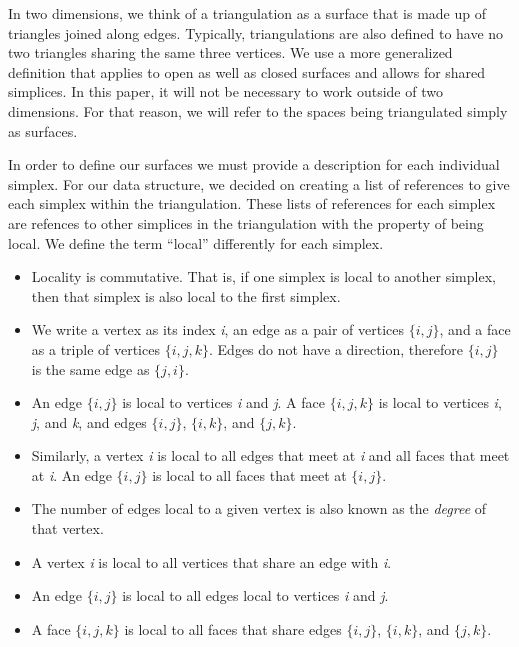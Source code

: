 \documentclass[12pt]{article}
\begin{document}
 In two dimensions, we think of a triangulation as a surface that is made up of triangles joined along edges. Typically, triangulations are also defined to have no two triangles sharing the same three vertices. We use a more generalized definition that applies to open as well as closed surfaces and allows for shared simplices. In this paper, it will not be necessary to work outside of two dimensions. For that reason, we will refer to the spaces being triangulated simply as surfaces.

 In order to define our surfaces we must provide a description for each individual simplex. For our data structure, we decided on creating a list of references to give each simplex within the triangulation. These lists of references for each simplex are refences to other simplices in the triangulation with the property of being local. We define the term ``local'' differently for each simplex.

\begin{itemize}
\item Locality is commutative. That is, if one simplex is local to another simplex, then that simplex is also local to the first simplex.
\item We write a vertex as its index \textit{i}, an edge as a pair of vertices $\{i, j\}$, and a face as a triple of vertices $\{i, j, k\}$. Edges do not have a direction, therefore $\{i, j\}$ is the same edge as $\{j, i\}$. 
\item An edge $\{i, j\}$ is local to vertices \textit{i} and \textit{j}. A face $\{i, j, k\}$ is local to vertices \textit{i}, \textit{j}, and \textit{k}, and edges $\{i, j\}$, $\{i, k\}$, and $\{j, k\}$.
\item Similarly, a vertex \textit{i} is local to all edges that meet at \textit{i} and all faces that meet at \textit{i}. An edge $\{i, j\}$ is local to all faces that meet at $\{i, j\}$.
\item The number of edges local to a given vertex is also known as the \textit{degree} of that vertex.
\item A vertex \textit{i} is local to all vertices that share an edge with \textit{i}.
\item An edge $\{i, j\}$ is local to all edges local to vertices \textit{i} and \textit{j}.
\item A face $\{i, j, k\}$ is local to all faces that share edges $\{i, j\}$, $\{i, k\}$, and $\{j, k\}$.
\end{itemize}
\end{document}
